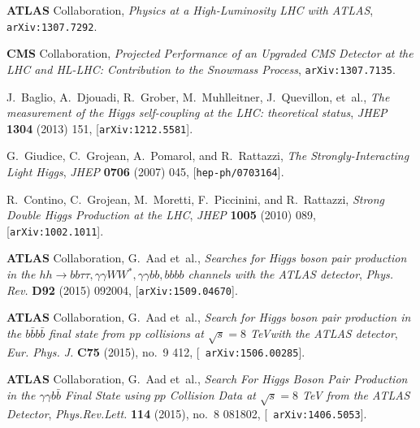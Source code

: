 \documentclass[a4paper,11pt]{article}
\begin{document}
\providecommand{\href}[2]{#2}\begingroup\raggedright\begin{thebibliography}{100}

{\bf ATLAS} Collaboration, {\it {Physics at a High-Luminosity LHC with ATLAS}},
   \href{http://arxiv.org/abs/1307.7292}{{\tt arXiv:1307.7292}}.

{\bf CMS} Collaboration, {\it {Projected Performance of an Upgraded CMS
  Detector at the LHC and HL-LHC: Contribution to the Snowmass Process}},
  \href{http://arxiv.org/abs/1307.7135}{{\tt arXiv:1307.7135}}.

J.~Baglio, A.~Djouadi, R.~Grober, M.~Muhlleitner, J.~Quevillon, et~al., {\it
  {The measurement of the Higgs self-coupling at the LHC: theoretical status}},
   {\em JHEP} {\bf 1304} (2013) 151,
  [\href{http://arxiv.org/abs/1212.5581}{{\tt arXiv:1212.5581}}].

G.~Giudice, C.~Grojean, A.~Pomarol, and R.~Rattazzi, {\it {The
  Strongly-Interacting Light Higgs}},  {\em JHEP} {\bf 0706} (2007) 045,
  [\href{http://arxiv.org/abs/hep-ph/0703164}{{\tt hep-ph/0703164}}].

R.~Contino, C.~Grojean, M.~Moretti, F.~Piccinini, and R.~Rattazzi, {\it {Strong
  Double Higgs Production at the LHC}},  {\em JHEP} {\bf 1005} (2010) 089,
  [\href{http://arxiv.org/abs/1002.1011}{{\tt arXiv:1002.1011}}].

{\bf ATLAS} Collaboration, G.~Aad et~al., {\it {Searches for Higgs boson pair
  production in the $hh\to bb\tau\tau, \gamma\gamma WW^*, \gamma\gamma bb,
  bbbb$ channels with the ATLAS detector}},  {\em Phys. Rev.} {\bf D92} (2015)
  092004, [\href{http://arxiv.org/abs/1509.04670}{{\tt arXiv:1509.04670}}].

{\bf ATLAS} Collaboration, G.~Aad et~al., {\it {Search for Higgs boson pair
  production in the $b\bar{b}b\bar{b}$ final state from pp collisions at
  $\sqrt{s} = 8$ TeVwith the ATLAS detector}},  {\em Eur. Phys. J.} {\bf C75}
  (2015), no.~9 412, [\href{http://arxiv.org/abs/1506.00285}{{\tt
  arXiv:1506.00285}}].

{\bf ATLAS} Collaboration, G.~Aad et~al., {\it {Search For Higgs Boson Pair
  Production in the $\gamma\gamma b\bar{b}$ Final State using $pp$ Collision
  Data at $\sqrt{s}=8$ TeV from the ATLAS Detector}},  {\em Phys.Rev.Lett.}
  {\bf 114} (2015), no.~8 081802, [\href{http://arxiv.org/abs/1406.5053}{{\tt
  arXiv:1406.5053}}].


\end{thebibliography}
\end{document}
